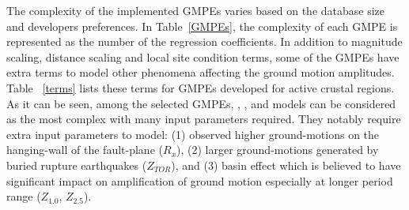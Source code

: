 The complexity of the implemented GMPEs varies based on the database
size and developers preferences. In Table~\ref{GMPEs}, the
complexity of each GMPE is represented as the number of the
regression coefficients. In addition to magnitude scaling, distance
scaling and local site condition terms, some of the GMPEs have extra
terms to model other phenomena affecting the ground motion
amplitudes. Table ~\ref{terms} lists these terms for GMPEs developed
for active crustal regions. As it can be seen, among the selected
GMPEs, \citet{eqrm_Abrahamson08}, \citet{eqrm_Campbell08}, and
\citet{eqrm_Chiou08} models can be considered as the most complex
with many input parameters required. They notably require extra
input parameters to model: (1) observed higher ground-motions on the
hanging-wall of the fault-plane ($R_x$), (2) larger ground-motions
generated by buried rupture earthquakes ($Z_{TOR}$), and (3) basin
effect which is believed to have significant impact on amplification
of ground motion especially at longer period range ($Z_{1.0}$,
$Z_{2.5}$).

